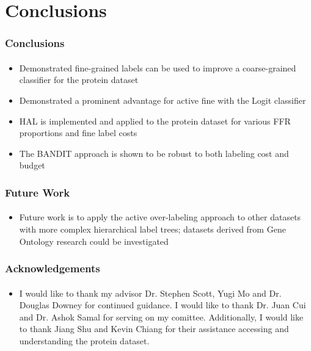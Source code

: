 \documentclass{beamer}
\begin{document}
\section{Conclusions}
\begin{frame}
    \frametitle{Conclusions}  %
    \framesubtitle{}
    \begin{itemize}
    \item Demonstrated fine-grained labels can be used to improve a coarse-grained classifier for the protein dataset
    \item Demonstrated a prominent advantage for active fine with the Logit classifier
    \item HAL is implemented and applied to the protein dataset for various FFR proportions and fine label costs
    \item The BANDIT approach is shown to be robust to both labeling cost and budget
    \end{itemize}
\end{frame}
\begin{frame}
    \frametitle{Future Work}  %
    \framesubtitle{}
    \begin{itemize}
      \item Future work is to apply the active over-labeling approach
      to other datasets with more complex hierarchical label trees;
      datasets derived from Gene Ontology research could be investigated
    \end{itemize}
\end{frame}
\begin{frame}
    \frametitle{Acknowledgements}
    \framesubtitle{}
    \begin{itemize}
      \item I would like to thank my advisor Dr. Stephen Scott,
      Yugi Mo and Dr. Douglas Downey for continued guidance. I would like to
      thank Dr. Juan Cui and Dr. Ashok Samal for serving on my comittee. Additionally,
      I would like to thank Jiang Shu and Kevin Chiang for their
      assistance accessing and understanding the protein dataset.
    \end{itemize}
\end{frame}
\end{document}
